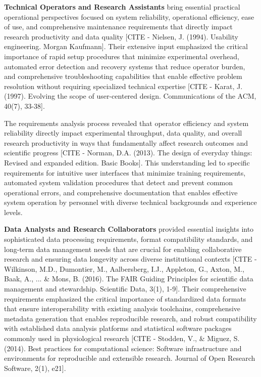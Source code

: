 \documentclass[12pt,a4paper]{report}
\begin{document}
\textbf{Technical Operators and Research Assistants} bring essential practical operational perspectives focused on system
reliability, operational efficiency, ease of use, and comprehensive maintenance requirements that directly impact
research productivity and data quality [CITE - Nielsen, J. (1994). Usability engineering. Morgan Kaufmann]. Their
extensive input emphasized the critical importance of rapid setup procedures that minimize experimental overhead,
automated error detection and recovery systems that reduce operator burden, and comprehensive troubleshooting
capabilities that enable effective problem resolution without requiring specialized technical
expertise [CITE - Karat, J. (1997). Evolving the scope of user-centered design. Communications of the ACM, 40(7), 33-38].

The requirements analysis process revealed that operator efficiency and system reliability directly impact experimental
throughput, data quality, and overall research productivity in ways that fundamentally affect research outcomes and
scientific
progress [CITE - Norman, D.A. (2013). The design of everyday things: Revised and expanded edition. Basic Books]. This
understanding led to specific requirements for intuitive user interfaces that minimize training requirements, automated
system validation procedures that detect and prevent common operational errors, and comprehensive documentation that
enables effective system operation by personnel with diverse technical backgrounds and experience levels.

\textbf{Data Analysts and Research Collaborators} provided essential insights into sophisticated data processing
requirements, format compatibility standards, and long-term data management needs that are crucial for enabling
collaborative research and ensuring data longevity across diverse institutional
contexts [CITE - Wilkinson, M.D., Dumontier, M., Aalbersberg, I.J., Appleton, G., Axton, M., Baak, A., ... \& Mons, B. (2016). The FAIR Guiding Principles for scientific data management and stewardship. Scientific Data, 3(1), 1-9].
Their comprehensive requirements emphasized the critical importance of standardized data formats that ensure
interoperability with existing analysis toolchains, comprehensive metadata generation that enables reproducible
research, and robust compatibility with established data analysis platforms and statistical software packages commonly
used in physiological
research [CITE - Stodden, V., \& Miguez, S. (2014). Best practices for computational science: Software infrastructure and environments for reproducible and extensible research. Journal of Open Research Software, 2(1), e21].
\end{document}

